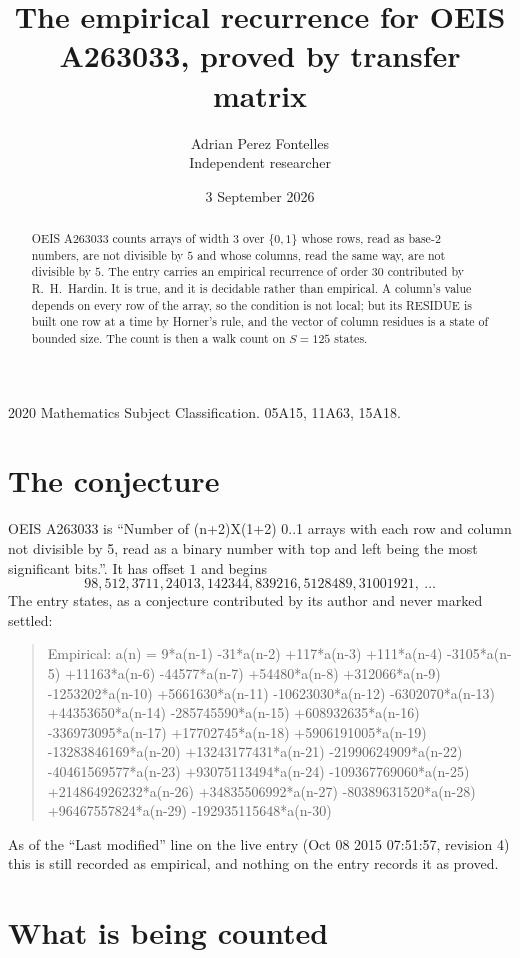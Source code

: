 \documentclass[11pt,a4paper]{article}
\title{The empirical recurrence for OEIS A263033, proved by transfer matrix}
\author{Adrian Perez Fontelles\\ \small Independent researcher}
\date{3 September 2026}
\theoremstyle{plain}
\theoremstyle{definition}
\begin{document}
\maketitle

\begin{abstract}
OEIS A263033 counts arrays of width $3$ over $\{0,1\}$ whose rows, read as base-$2$
numbers, are not divisible by $5$ and whose columns, read the same way, are not divisible by
$5$. The entry carries an empirical recurrence of order $30$ contributed by
R.~H.~Hardin. It is true, and it is decidable rather than empirical. A column's value depends on
every row of the array, so the condition is not local; but its RESIDUE is built one row at a
time by Horner's rule, and the vector of column residues is a state of bounded size. The count
is then a walk count on $S=125$ states.
\end{abstract}

\noindent\small 2020 Mathematics Subject Classification. 05A15, 11A63, 15A18.\normalsize

\section{The conjecture}

OEIS A263033 is ``Number of (n+2)X(1+2) 0..1 arrays with each row and column not divisible by 5, read as a binary number with top and left being the most significant bits.''. It has offset $1$ and begins
\[
98, 512, 3711, 24013, 142344, 839216, 5128489, 31001921,\ \dots
\]
The entry states, as a conjecture contributed by its author and never marked settled:
\begin{quote}
Empirical: a(n) = 9*a(n-1) -31*a(n-2) +117*a(n-3) +111*a(n-4) -3105*a(n-5) +11163*a(n-6) -44577*a(n-7) +54480*a(n-8) +312066*a(n-9) -1253202*a(n-10) +5661630*a(n-11) -10623030*a(n-12) -6302070*a(n-13) +44353650*a(n-14) -285745590*a(n-15) +608932635*a(n-16) -336973095*a(n-17) +17702745*a(n-18) +5906191005*a(n-19) -13283846169*a(n-20) +13243177431*a(n-21) -21990624909*a(n-22) -40461569577*a(n-23) +93075113494*a(n-24) -109367769060*a(n-25) +214864926232*a(n-26) +34835506992*a(n-27) -80389631520*a(n-28) +96467557824*a(n-29) -192935115648*a(n-30)
\end{quote}
As of the ``Last modified'' line on the live entry (Oct 08 2015 07:51:57, revision 4) this is still
recorded as empirical, and nothing on the entry records it as proved.

\section{What is being counted}
\end{document}
